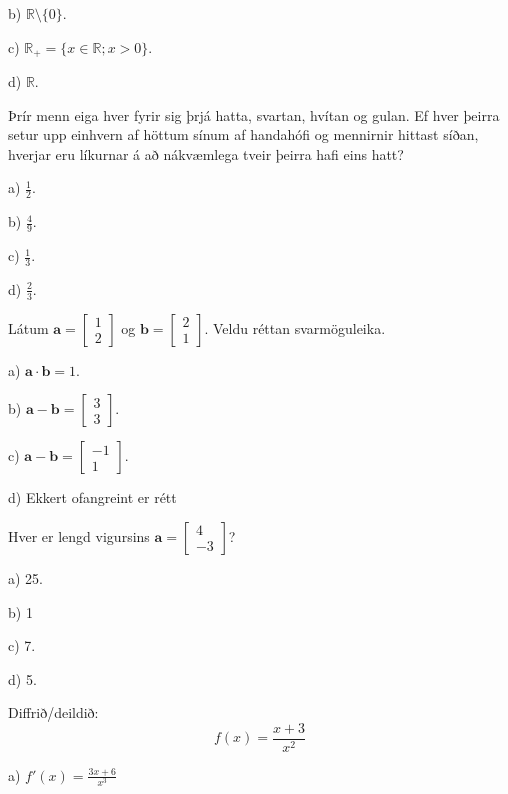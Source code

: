b) $\mathbb{R} \setminus \{0\}$.

c) $\mathbb{R}_+ = \{ x \in \mathbb{R} ; x>0\}$. %

d) $\mathbb{R}$.


\item Þrír menn eiga hver fyrir sig þrjá hatta, svartan, hvítan og gulan. Ef hver þeirra setur upp einhvern af höttum sínum af handahófi og mennirnir hittast síðan, hverjar eru líkurnar á að nákvæmlega tveir þeirra hafi eins hatt?

a) $ \frac{1}{2}$.

b) $ \frac{4}{9}$.

c) $ \frac{1}{3}$.

d) $ \frac{2}{3}$. %


\item Látum $ \mathbf{a} =
\left[
\begin{matrix}
1\\
2
\end{matrix}
\right]
$
og
$
\mathbf{b} =
\left[
\begin{matrix}
2\\
1
\end{matrix}
\right]
$.
Veldu réttan svarmöguleika.

a) $ \mathbf{a} \cdot \mathbf{b} = 1$.

b) $ \mathbf{a} - \mathbf{b} = \left[  \begin{matrix} 3 \\ 3 \end{matrix} \right] $.

c) $ \mathbf{a} - \mathbf{b} = \left[  \begin{matrix} -1\\ 1 \end{matrix} \right] $. %

d) Ekkert ofangreint er rétt


\item Hver er lengd vigursins $ \mathbf{a} =
\left[
\begin{matrix}
4\\
-3
\end{matrix}
\right]$?

a) 25.

b) 1

c) 7.

d) 5. %


\item Diffrið/deildið: $$f(x)=\frac{x+3}{x^2}$$

a) \hspace{2mm} $\displaystyle f'(x)=\frac{3x+6}{x^3}$

